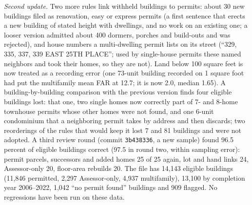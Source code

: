 \textit{Second update.} Two more rules link withheld buildings to permits: about 30 new buildings filed as renovation,
easy or express permits (a first sentence that erects a new building of stated height with dwellings, and no work on
an existing one; a looser version admitted about 400 dormers, porches and build-outs and was rejected), and house
numbers a multi-dwelling permit lists on its street (``329, 335, 337, 339 EAST 25TH PLACE''; used by single-house
permits these named neighbors and took their homes, so they are not). Land below 100 square feet is now treated as a
recording error (one 73-unit building recorded on 1 square foot had put the multifamily mean FAR at 12.7; it is now
2.0, median 1.65). A building-by-building comparison with the previous version finds four eligible buildings lost:
that one, two single homes now correctly part of 7- and 8-home townhouse permits whose other homes were not found, and
one 6-unit condominium that a neighboring permit takes by address and then discards; two reorderings of the rules
that would keep it lost 7 and 81 buildings and were not adopted. A third review round (commit \texttt{3b438336}, a
new sample) found 96.5 percent of eligible buildings correct (97.5 in round two, within sampling error): permit
parcels, successors and added homes 25 of 25 again, lot and hand links 24, Assessor-only 20, floor-area rebuilds 20.
The file has 14,143 eligible buildings (11,846 permitted, 2,297 Assessor-only, 4,937 multifamily), 13,100 by
completion year 2006--2022, 1,042 ``no permit found'' buildings and 909 flagged. No regressions have been run on these
data.

